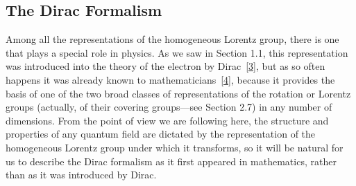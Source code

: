 
\subsection{The Dirac Formalism}

Among all the representations of the homogeneous Lorentz group, there is one
that plays a special role in physics. As we saw in Section 1.1, this
representation was introduced into the theory of the electron by Dirac~\hyperref[ref:5.3]{[3]},
but as so often happens it was already known to mathematicians~\hyperref[ref:5.4]{[4]}, because it
provides the basis of one of the two broad classes of representations of the
rotation or Lorentz groups (actually, of their covering groups---see Section
2.7) in any number of dimensions. From the point of view we are following
here, the structure and properties of any quantum field are dictated by the
representation of the homogeneous Lorentz group under which it transforms, so
it will be natural for us to describe the Dirac formalism as it first appeared
in mathematics, rather than as it was introduced by Dirac.


